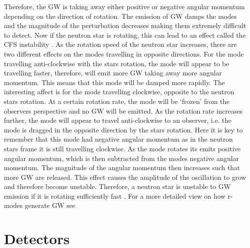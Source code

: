 Therefore, the \gls{GW} is taking away either positive or negative angular momentum depending on the direction of rotation.
The emission of \gls{GW} damps the modes and the magnitude of the perturbation decreases making them extremely difficult to detect.
Now if the neutron star is rotating, this can lead to an effect called the \gls{CFS} instability  \citep{chandrasekhar1970SolutionsTwo,friedman1978SecularInstability}. 
As the rotation speed of the neutron star increases, there are two different effects on the modes travelling in opposite directions. 
For the mode travelling anti-clockwise with the stars rotation, the mode will appear to be travelling faster, therefore, will emit more \gls{GW} taking away more angular momentum. This means that this mode will be damped more rapidly.
The interesting affect is for the mode travelling clockwise, opposite to the neutron stars rotation. 
At a certain rotation rate, the mode will be `frozen' from the observers perspective and no \gls{GW} will be emitted.
As the rotation rate increases further, the mode will appear to travel anti-clockwise to an observer, i.e. the mode is dragged in the opposite direction by the stars rotation. 
Here it is key to remember that this mode had negative angular momentum as in the neutron stars frame it is still travelling clockwise.
As the mode rotates its emits positive angular momentum, which is then subtracted from the modes negative angular momentum.
The magnitude of the angular momentum then increases such that more \gls{GW} are released.
This effect causes the amplitude of the oscillation to grow and therefore become unstable.
Therefore, a neutron star is unstable to \gls{GW} emission if it is rotating sufficiently fast \citep{lasky2015GravitationalWaves}.
For a more detailed view on how r-modes generate \gls{GW} see \citep{owen1998GravitationalWaves,jonesCFSInstability}


\section{\label{intro:detector}Detectors}

